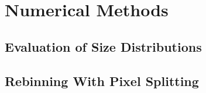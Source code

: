 \documentclass[\main/dresen_thesis.tex]{subfiles}
\renewcommand{\thisPath}{\main/chapters/appendix/numericalMethods}
\begin{document}
\chapter{Numerical Methods}
  \section{Evaluation of Size Distributions}\label{ch:appendix:numericalMethods:sizeDistributions}
    
    \FloatBarrier

  \section{Rebinning With Pixel Splitting}\label{ch:appendix:numericalMethods:rebinningPixelSplitting}
    
    \FloatBarrier
% 
\end{document}
